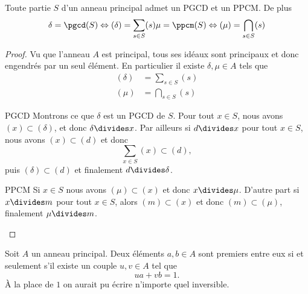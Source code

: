 \begin{theorem}
    Toute partie \( S\) d'un anneau principal admet un PGCD et un PPCM. De plus
    \begin{equation}
        \begin{aligned}[]
            \delta=\pgcd(S)\Leftrightarrow (\delta)=\sum_{s\in S}(s)
            \mu=\ppcm(S)\Leftrightarrow (\mu)=\bigcap_{s\in S}(s)
        \end{aligned}
    \end{equation}
\end{theorem}

\begin{proof}
    Vu que l'anneau \( A\) est principal, tous ses idéaux sont principaux et donc engendrés par un seul élément. En particulier il existe \( \delta,\mu\in A\) tels que
    \begin{subequations}
        \begin{align}
            (\delta)&=\sum_{s\in S}(s)\\
            (\mu)&=\bigcap_{s\in S}(s)
        \end{align}
    \end{subequations}
    \begin{subproof}
    \item[PGCD]
        Montrons ce que \( \delta\) est un PGCD de \( S\). Pour tout \( x\in S\), nous avons \( (x)\subset (\delta)\), et donc \( \delta\divides x\). Par ailleurs si \( d\divides x\) pour tout \( x\in S\), nous avons \( (x)\subset (d)\) et donc 
        \begin{equation}
            \sum_{x\in S}(x)\subset (d),
        \end{equation}
        puis \( (\delta)\subset (d)\) et finalement \( d\divides \delta\).
        \item[PPCM]
            Si \( x\in S\) nous avons \( (\mu)\subset (x)\) et donc \( x\divides \mu\). D'autre part si \( x\divides m\) pour tout \( x\in S\), alors \( (m)\subset (x)\) et donc \( (m)\subset(\mu)\), finalement \( \mu\divides m\).
    \end{subproof}
\end{proof}

\begin{corollary}\label{CorimHyXy}
    Soit \( A\) un anneau principal. Deux éléments \( a,b\in A\) sont premiers entre eux si et seulement s'il existe un couple \( u,v\in A\) tel que
    \begin{equation}
        ua+vb=1.
    \end{equation}
    À la place de \( 1\) on aurait pu écrire n'importe quel inversible.
\end{corollary}

